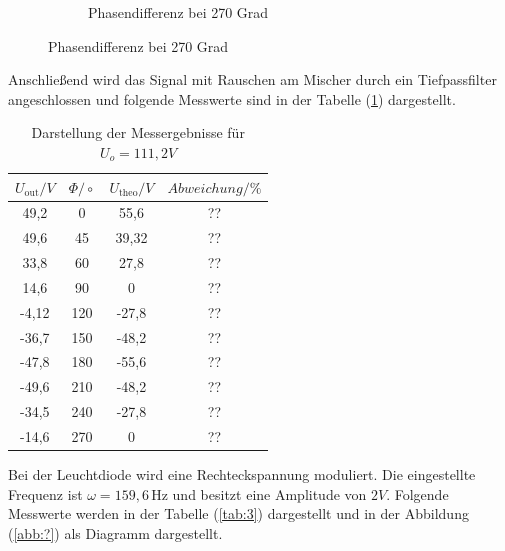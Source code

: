 \begin{figure}[H]
\begin{subfigure}{0.48\textwidth}
  \caption{Phasendifferenz bei 270 Grad}
\end{subfigure}
\end{figure}

Anschließend wird das Signal mit Rauschen am Mischer durch ein Tiefpassfilter angeschlossen und folgende
Messwerte sind in der Tabelle (\ref{tab:2}) dargestellt.
\begin{table}[H]
\centering
\caption{Darstellung der Messergebnisse für $U_o =111,2 V$}
\label{tab:2}
 \begin{tabular}{c c c c}
  \toprule
     $U_\text{out} / V$ & $\Phi/\circ$ & $U_\text{theo} / V$ & $Abweichung / \%$ \\
  \midrule
  49,2  & 0   & 55,6  &??\\
  49,6  & 45  & 39,32 &??\\
  33,8  & 60  & 27,8  &??\\
  14,6  & 90  &   0   &??\\
  -4,12 & 120 &-27,8  &??\\
  -36,7 & 150 &-48,2  &??\\
  -47,8 & 180 &-55,6  &??\\
  -49,6 & 210 &-48,2  &??\\
  -34,5 & 240 &-27,8  &??\\
  -14,6 & 270 &   0   &??\\
  \bottomrule
\end{tabular}
\end{table}


Bei der Leuchtdiode wird eine Rechteckspannung moduliert. Die eingestellte Frequenz ist $\omega = 159,6 \, \si{\hertz}$ und
besitzt eine Amplitude von $2 V$.
Folgende Messwerte werden in der Tabelle (\ref{tab:3}) dargestellt und in der Abbildung (\ref{abb:?}) als
Diagramm dargestellt.

